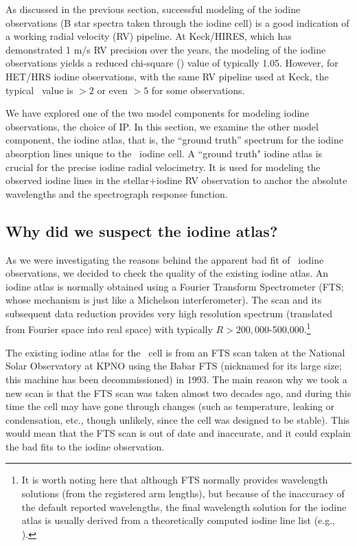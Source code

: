 
As discussed in the previous section, successful modeling of the
iodine observations (B star spectra taken through the iodine cell) is
a good indication of a working radial velocity (RV) pipeline. At
Keck/HIRES, which has demonstrated 1 m/s RV precision over the years,
the modeling of the iodine observations yields a reduced chi-square
(\chisq) value of typically 1.05. However, for HET/HRS iodine
observations, with the same RV pipeline used at Keck, the typical
\chisq\ value is $>2$ or even $>5$ for some observations. 

We have explored one of the two model components for modeling iodine
observations, the choice of IP. In this section, we examine the other
model component, the iodine atlas, that is, the ``ground truth''
spectrum for the iodine absorption lines unique to the \het\ iodine
cell. A ``ground truth" iodine atlas is crucial for the precise iodine
radial velocimetry. It is used for modeling the observed iodine lines
in the stellar$+$iodine RV observation to anchor the absolute
wavelengths and the spectrograph response function. 


\subsection{Why did we suspect the iodine atlas?}

As we were investigating the reasons behind the apparent bad fit of
\het\ iodine observations, we decided to check the quality of the
existing iodine atlas. An iodine atlas is normally obtained using a
Fourier Transform Spectrometer (FTS; whose mechanism is just like a
Michelson interferometer). The scan and its subsequent data reduction
provides very high resolution spectrum (translated from Fourier space
into real space) with typically $R > 200,000$-500,000.\footnote{It is worth
noting here that although FTS normally provides wavelength solutions
(from the registered arm lengths), but because of the inaccuracy of
the default reported wavelengths, the final wavelength solution for
the iodine atlas is usually derived from a theoretically computed iodine
line list (e.g., \citealt{iodinespec5}).}

The existing iodine atlas for the \het\ cell is from an FTS scan taken
at the National Solar Observatory at KPNO using the Babar FTS
(nicknamed for its large size; this machine has been decommissioned)
in 1993. The main reason why we took a new scan is that the FTS scan
was taken almost two decades ago, and during this time the cell may
have gone through changes (such as temperature, leaking or
condensation, etc., though unlikely, since the cell was designed to be
stable). This would mean that the FTS scan is out of date and
inaccurate, and it could explain the bad fits to the iodine
observation.

